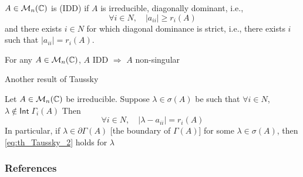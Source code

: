 \documentclass[aspectratio=169]{beamer}
\begin{document}
 
\begin{frame}
\begin{definition}
$A\in \mathcal{M}_n(\mathbb{C})$ is  (IDD) if $A$ is irreducible, diagonally dominant, i.e.,
\[
\forall i\in N,\quad  |a_{ii}|\geq r_i(A)
\]
and there exists $i\in N$ for which diagonal dominance is strict, i.e., there exists $i$ such that $|a_{ii}|=r_i(A)$.
\end{definition}
\vfill
\begin{theorem}
For any $A\in \mathcal{M}_n(\mathbb{C})$, $A$ IDD $\Rightarrow$ $A$ non-singular
\end{theorem}
\end{frame}


\begin{frame}{Another result of Taussky}
\begin{theorem}
Let $A\in\mathcal{M}_n(\mathbb{C})$ be irreducible. Suppose $\lambda\in\sigma(A)$ be such that $\forall i\in N$, $\lambda\not\in\mathsf{Int}\;\Gamma_i(A)$
Then
\begin{equation}\label{eq:th_Taussky_2}
\forall i\in N,\quad |\lambda-a_{ii}|=r_i(A)
\end{equation}
In particular, if $\lambda\in\partial\Gamma(A)$ [the boundary of $\Gamma(A)$] for some $\lambda\in\sigma(A)$, then \eqref{eq:th_Taussky_2} holds for $\lambda$
\end{theorem}
\end{frame}


\begin{frame}[allowframebreaks]
  \frametitle{References}
  
  
  \end{frame}
  
\end{document}
